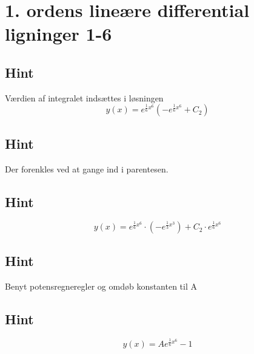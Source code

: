 \documentclass{article}
\newenvironment{exercise}[1]{\newpage\section{#1}}{}
\newcommand{\hint}{\subsection*{Hint}}
\begin{document}
\begin{exercise}{1. ordens lineære differential ligninger 1-6}
	\hint
	
	Værdien af integralet indsættes i løsningen
	\[
	y(x) = e^{\frac{1}{6}x^6} \left( -e^{\frac{1}{6}x^6} + C_2\right)
	\]
	
	\hint
	
	Der forenkles ved at gange ind i parentesen.
	
	\hint
	\[
	y(x) = e^{\frac{1}{6}x^6} \cdot \left(-e^{\frac{1}{3}x^3} \right) + C_2 \cdot e^{\frac{1}{6}x^6} 
	\]
	
	\hint
	
	Benyt potensregneregler og omdøb konstanten til A
	
	\hint
	\[
	y(x) = A e^{\frac{1}{6}x^6} - 1
	\]
	
	
\end{exercise}

\newpage
\end{document}
